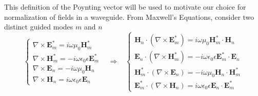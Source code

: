 This definition of the Poynting vector will be used to motivate our choice for normalization of fields in a waveguide. From Maxwell's Equations, consider two distinct guided modes $m$ and $n$
%
\begin{equation}
\begin{cases}
\nabla\times\textbf{E}_m^*=i\omega\mu_0\textbf{H}_m^*\\
\nabla\times\textbf{H}_m^*=-i\omega\epsilon_0\epsilon\textbf{E}_m^*\\
\nabla\times\textbf{E}_n=-i\omega\mu_0\textbf{H}_n\\
\nabla\times\textbf{H}_n=i\omega\epsilon_0\epsilon\textbf{E}_n
\end{cases}\;\;\;\Rightarrow\;\;\;
\begin{cases}
\textbf{H}_n\cdot(\nabla\times\textbf{E}_m^*)=i\omega\mu_0\textbf{H}_m^*\cdot\textbf{H}_n\\
\textbf{E}_n\cdot(\nabla\times\textbf{H}_m^*)=-i\omega\epsilon_0\epsilon\textbf{E}_m^*\cdot\textbf{E}_n\\
\textbf{H}_m^*\cdot(\nabla\times\textbf{E}_n)=-i\omega\mu_0\textbf{H}_n\cdot\textbf{H}_m^*\\
\textbf{E}_m^*\cdot(\nabla\times\textbf{H}_n)=i\omega\epsilon_0\epsilon\textbf{E}_n\cdot \textbf{E}_m^*
\end{cases}
\end{equation}
%
%
